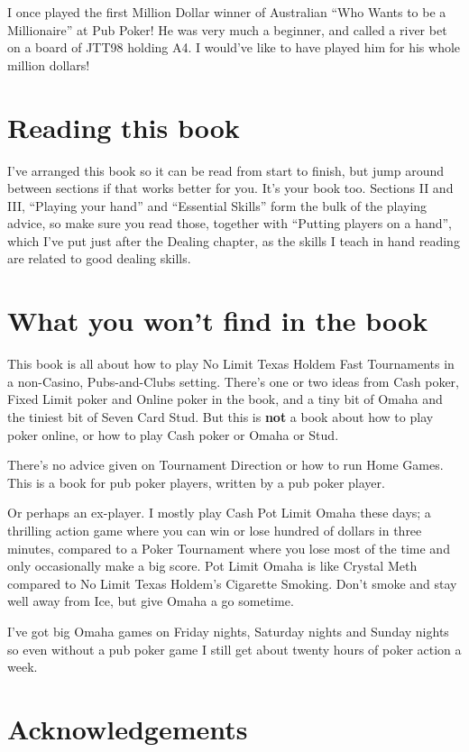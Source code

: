 I once played the first Million Dollar winner of Australian ``Who
Wants to be a Millionaire'' at Pub Poker! He was very much a beginner,
and called a river bet on a board of JTT98 holding A4. I would've like
to have played him for his whole million dollars!

\section{Reading this book}

I've arranged this book so it can be read from start to finish, but jump
around between sections if that works better for you. It's your book too.
Sections II and III, ``Playing your hand'' and ``Essential Skills'' form
the bulk of the playing advice, so make sure you read those, together
with ``Putting players on a hand'', which I've put just after the
Dealing chapter, as the skills I teach in hand reading are related
to good dealing skills.

\section{What you won't find in the book}

This book is all about how to play No Limit Texas Holdem Fast
Tournaments in a non-Casino, Pubs-and-Clubs setting. There's one or
two ideas from Cash poker, Fixed Limit poker and Online poker in the
book, and a tiny bit of Omaha and the tiniest bit of Seven Card Stud.
But this is \textbf{not} a book about how to play poker online, or how
to play Cash poker or Omaha or Stud.

There's no advice given on Tournament Direction or how to run Home
Games. This is a book for pub poker players, written by a pub poker
player.

Or perhaps an ex-player. I mostly play Cash Pot Limit Omaha these days;
a thrilling action game where you can win or lose hundred of dollars
in three minutes, compared to a Poker Tournament where you lose most of
the time and only occasionally make a big score. Pot Limit Omaha
is like Crystal Meth compared to No Limit Texas Holdem's Cigarette
Smoking. Don't smoke and stay well away from Ice, but give Omaha a go
sometime.

I've got big Omaha games on Friday nights, Saturday nights and Sunday
nights so even without a pub poker game I still get about twenty hours
of poker action a week.


\section{Acknowledgements}

